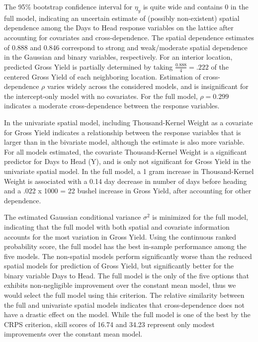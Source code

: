 \documentclass[12pt, a4paper, twoside]{article}
\begin{document}
 The 95\% bootstrap confidence interval for $\eta_{y}$ is quite wide and contains 0  in the full model, indicating an uncertain estimate of (possibly non-existent) spatial dependence among the Days to Head response variables on the lattice after accounting for covariates and cross-dependence. The spatial dependence estimates of 0.888 and 0.846 correspond to strong and weak/moderate spatial dependence in the Gaussian and binary variables, respectively. For an interior location, predicted Gross Yield is partially determined by taking $\frac{0.888}{4}=.222$ of the centered Gross Yield of each neighboring location. Estimation of cross-dependence $\rho$ varies widely across the considered models, and is insignificant for the intercept-only model with no covariates. For the full model, $\rho=0.299$ indicates a moderate cross-dependence between the response variables.

In the univariate spatial model, including Thousand-Kernel Weight as a covariate for Gross Yield indicates a relationship between the response variables that is larger than in the bivariate model, although the estimate is also more variable. For all models estimated, the covariate Thousand-Kernel Weight is a significant predictor for Days to Head (Y), and is only not significant for Gross Yield in the univariate spatial model. In the full model, a 1 gram increase in Thousand-Kernel Weight is associated with a 0.14 day decrease in number of days before heading and a .022 x 1000 = 22 bushel increase in Gross Yield, after accounting for other dependence. 

The estimated Gaussian conditional variance $\sigma^2$ is minimized for the full model, indicating that the full model with both spatial and covariate information accounts for the most variation in Gross Yield.  Using the continuous ranked probability score, the full model has the best in-sample performance among the five models. The non-spatial models perform significantly worse than the reduced spatial models for prediction of Gross Yield, but significantly better for the binary variable Days to Head. The full model is the only of the five options that exhibits non-negligible improvement over the constant mean model, thus we would select the full model using this criterion. The relative similarity between the full and univariate spatial models indicates that cross-dependence does not have a drastic effect on the model. While the full model is one of the best by the CRPS criterion, skill scores of 16.74 and 34.23 represent only modest improvements over the constant mean model.
\end{document}
